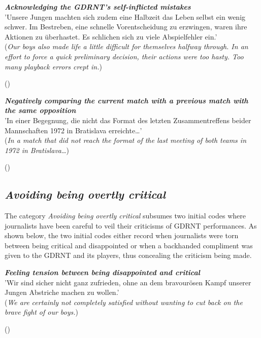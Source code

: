 \begin{displayquote}
\begin{small}
\textbf{\textit{Acknowledging the GDRNT’s self-inflicted mistakes}}\\
'Unsere Jungen machten sich zudem eine Halbzeit das Leben selbst ein wenig schwer. Im Bestreben, eine schnelle Vorentscheidung zu erzwingen, waren ihre Aktionen zu überhastet. Es schlichen sich zu viele Abspielfehler ein.'\\
(\textit{Our boys also made life a little difficult for themselves halfway through. In an effort to force a quick preliminary decision, their actions were too hasty. Too many playback errors crept in.})\
\begin{flushright}\footnotesize (\cite{nd19740615})\end{flushright}
\end{small}
\end{displayquote}

\begin{displayquote}
\begin{small}
\textbf{\textit{Negatively comparing the current match with a previous match with the same opposition}}\\
'In einer Begegnung, die nicht das Format des letzten Zusammentreffens beider Mannschaften 1972 in Bratislava erreichte…'\\
(\textit{In a match that did not reach the format of the last meeting of both teams in 1972 in Bratislava…})\
\begin{flushright}\footnotesize (\cite{nd19740615})\end{flushright}
\end{small}
\end{displayquote}

\subsection*{\textit{Avoiding being overtly critical}}

The category \textit{Avoiding being overtly critical} subsumes two initial codes where journalists have been careful to veil their criticisms of GDRNT performances. As shown below, the two initial codes either record when journalists were torn between being critical and disappointed or when a backhanded compliment was given to the GDRNT and its players, thus concealing the criticism being made.

\begin{displayquote}
\begin{small}
\textbf{\textit{Feeling tension between being disappointed and critical}}\\
'Wir sind sicher nicht ganz zufrieden, ohne an dem bravourösen Kampf unserer Jungen Abstriche machen zu wollen.'\\
(\textit{We are certainly not completely satisfied without wanting to cut back on the brave fight of our boys.})\
\begin{flushright}\footnotesize (\cite{nd19740619})\end{flushright}
\end{small}
\end{displayquote}

